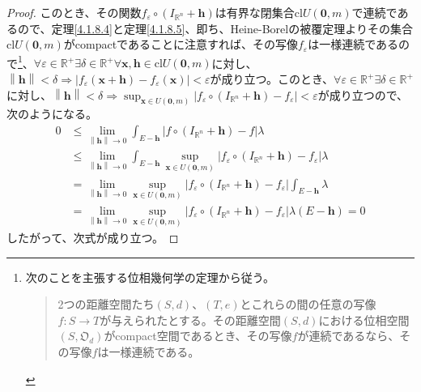 \documentclass[dvipdfmx]{jsarticle}
\begin{document}
\begin{proof}
このとき、その関数$f_{\varepsilon} \circ \left( I_{\mathbb{R}^{n}} + \mathbf{h} \right)$は有界な閉集合$\mathrm{cl}{U\left( \mathbf{0},m \right)}$で連続であるので、定理\ref{4.1.8.4}と定理\ref{4.1.8.5}、即ち、Heine-Borelの被覆定理よりその集合$\mathrm{cl}{U\left( \mathbf{0},m \right)}$がcompactであることに注意すれば、その写像$f_{\varepsilon}$は一様連続であるので\footnote{次のことを主張する位相幾何学の定理から従う。
  \begin{quote}
  2つの距離空間たち$(S,d)$、$(T,e)$とこれらの間の任意の写像$f:S \rightarrow T$が与えられたとする。その距離空間$(S,d)$における位相空間$\left( S,\mathfrak{O}_{d} \right)$がcompact空間であるとき、その写像$f$が連続であるなら、その写像$f$は一様連続である。
  \end{quote}
}、$\forall\varepsilon \in \mathbb{R}^{+}\exists\delta \in \mathbb{R}^{+}\forall\mathbf{x},\mathbf{h} \in \mathrm{cl}{U\left( \mathbf{0},m \right)}$に対し、$\left\| \mathbf{h} \right\| < \delta \Rightarrow \left| f_{\varepsilon}\left( \mathbf{x} + \mathbf{h} \right) - f_{\varepsilon}\left( \mathbf{x} \right) \right| < \varepsilon$が成り立つ。このとき、$\forall\varepsilon \in \mathbb{R}^{+}\exists\delta \in \mathbb{R}^{+}$に対し、$\left\| \mathbf{h} \right\| < \delta \Rightarrow \sup_{\mathbf{x} \in U\left( \mathbf{0},m \right)}\left| f_{\varepsilon} \circ \left( I_{\mathbb{R}^{n}} + \mathbf{h} \right) - f_{\varepsilon} \right| < \varepsilon$が成り立つので、次のようになる。
\begin{align*}
0 &\leq \lim_{\left\| \mathbf{h} \right\| \rightarrow 0}{\int_{E - \mathbf{h}} {\left| f \circ \left( I_{\mathbb{R}^{n}} + \mathbf{h} \right) - f \right|\lambda}}\\
&\leq \lim_{\left\| \mathbf{h} \right\| \rightarrow 0}{\int_{E - \mathbf{h}} {\sup_{\mathbf{x} \in U\left( \mathbf{0},m \right)}\left| f_{\varepsilon} \circ \left( I_{\mathbb{R}^{n}} + \mathbf{h} \right) - f_{\varepsilon} \right|\lambda}}\\
&= \lim_{\left\| \mathbf{h} \right\| \rightarrow 0}{\sup_{\mathbf{x} \in U\left( \mathbf{0},m \right)}\left| f_{\varepsilon} \circ \left( I_{\mathbb{R}^{n}} + \mathbf{h} \right) - f_{\varepsilon} \right|}\int_{E - \mathbf{h}} \lambda\\
&= \lim_{\left\| \mathbf{h} \right\| \rightarrow 0}{\sup_{\mathbf{x} \in U\left( \mathbf{0},m \right)}\left| f_{\varepsilon} \circ \left( I_{\mathbb{R}^{n}} + \mathbf{h} \right) - f_{\varepsilon} \right|}\lambda\left( E - \mathbf{h} \right) = 0
\end{align*}
したがって、次式が成り立つ。

\end{proof}
\end{document}
